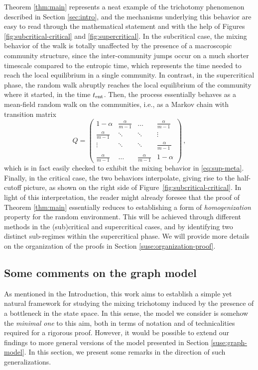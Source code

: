 \documentclass[11pt,oneside]{amsart}
\numberwithin{equation}{section}  %
\theoremstyle{plain}
\newcommand{\tent}{t_{\textup{ent}}}
\begin{document}
Theorem \ref{thm:main} represents a neat example of the trichotomy phenomenon described in Section \ref{sec:intro}, and the mechanisms underlying this behavior are easy to read through the mathematical statement and with the help of Figures \ref{fig:subcritical-critical}
and \ref{fig:supercritical}. 
 In the subcritical case, the mixing behavior of the walk is totally unaffected by the presence of a macroscopic community structure, since the inter-community jumps occur on a much shorter timescale compared to the entropic time, which represents the time needed to reach the local equilibrium in a single community. In contrast, in the supercritical phase, the random walk abruptly reaches the local equilibrium of the community where it started, in the time $\tent$. Then, the process essentially behaves as a mean-field random walk on the communities, i.e., as a Markov chain with transition matrix
\begin{equation}\label{eq:trans-complete}
	Q=\left(\begin{matrix} 
		1-\alpha            & \frac{\alpha}{m-1} &     \dots            & \frac{\alpha}{m-1} \\
		\frac{\alpha}{m-1}  &  \ddots            &     \ddots           &  \vdots\\
		\vdots              &  \ddots            &      \ddots          &   \frac{\alpha}{m-1\phantom{|}}\\     
		\frac{\alpha}{m-1}  &  \dots             &  \frac{\alpha}{m-1}  &  1-\alpha 
	\end{matrix}\right)\,,
\end{equation}
which is in fact easily checked to exhibit the mixing behavior in \eqref{eq:sup-meta}.
Finally, in the critical case, the two behaviors interpolate, 
giving rise to the half-cutoff picture, as shown on the right side of Figure~\ref{fig:subcritical-critical}. 
In light of this interpretation, the reader might already foresee
that the proof of Theorem \ref{thm:main} essentially reduces to establishing 
a form of \emph{homogenization} property for the random environment. 
This will be achieved through different methods in the (sub)critical 
and supercritical cases, and by identifying two distinct sub-regimes within the supercritical phase.
We will provide more details on the organization of the proofs in Section \ref{suse:organization-proof}.


\subsection{Some comments on the graph model}\label{suse:remarks-model}
As mentioned in the Introduction, this work aims to establish a simple yet natural framework 
for studying the mixing trichotomy induced by the presence of a bottleneck in the state space. 
In this sense, the model we consider is somehow the \emph{minimal one} to this aim, both in terms of notation and of technicalities required for a rigorous proof. However, it would be possible to extend our findings to more general versions of the model presented in Section \ref{suse:graph-model}. In this section, we present some remarks in the direction of such generalizations.
\end{document}
